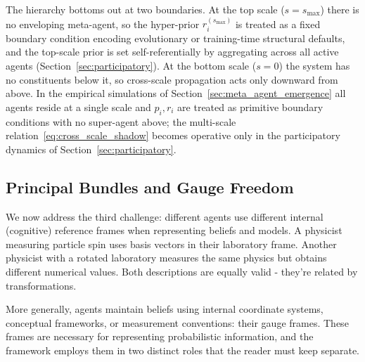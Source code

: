 \documentclass[11pt]{article}
\begin{document}
The hierarchy bottoms out at two boundaries. At the top scale ($s = s_{\max}$) there is no enveloping meta-agent, so the hyper-prior $r_i^{(s_{\max})}$ is treated as a fixed boundary condition encoding evolutionary or training-time structural defaults, and the top-scale prior is set self-referentially by aggregating across all active agents (Section~\ref{sec:participatory}). At the bottom scale ($s = 0$) the system has no constituents below it, so cross-scale propagation acts only downward from above. In the empirical simulations of Section~\ref{sec:meta_agent_emergence} all agents reside at a single scale and $p_i, r_i$ are treated as primitive boundary conditions with no super-agent above; the multi-scale relation~\eqref{eq:cross_scale_shadow} becomes operative only in the participatory dynamics of Section~\ref{sec:participatory}.

\subsection{Principal Bundles and Gauge Freedom}
\label{sec:agents_as_sections}

We now address the third challenge: different agents use different internal (cognitive) reference frames when representing beliefs and models. A physicist measuring particle spin uses basis vectors in their laboratory frame. Another physicist with a rotated laboratory measures the same physics but obtains different numerical values. Both descriptions are equally valid - they're related by transformations.

More generally, agents maintain beliefs using internal coordinate systems, conceptual frameworks, or measurement conventions: their gauge frames. These frames are necessary for representing probabilistic information, and the framework employs them in two distinct roles that the reader must keep separate.
\end{document}
